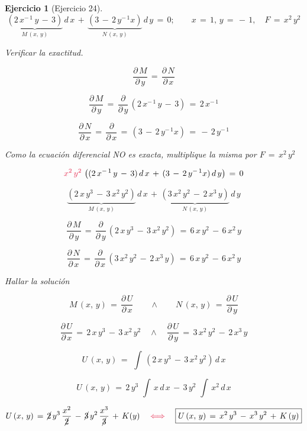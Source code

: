 \documentclass[a4paper,11pt,openany]{book}
\newtheorem{ejer}{Ejercicio}[section]
\begin{document}
\begin{ejer}[Ejercicio 24] 

  $$\underbrace{(2\,x^{-\,1}\,y\,-\,3)}_{M\,(x,\,y)}\,d\,x\,+\,\underbrace{(3\,-\,2\,y^{-\,1}x)}_{N\,(x,\,y)}\,d\,y\,=\,0; \qquad x\,=\,1, \, y\,=\,-\,1, \quad F\,=\,x^{2}\,y^{2}$$ 

 Verificar la exactitud. 

$$\dfrac{\partial\,M}{\partial\,y}\,=\,\dfrac{\partial\,N}{\partial\,x}$$ 

$$\dfrac{\partial\,M}{\partial\,y}\,=\,\dfrac{\partial}{\partial\,y}\,(2\,x^{-\,1}\,y\,-\,3)\,=\,2\,x^{-\,1}$$ 

$$\dfrac{\partial\,N}{\partial\,x}\,=\,\dfrac{\partial}{\partial\,x}\,=\,(3\,-\,2\,y^{-\,1}x)\,=\,-\,2\,y^{-\,1}$$

 Como la ecuación diferencial NO es exacta, multiplique la misma por $F\,=\,x^{2}\,y^{2}$ 


$$\textcolor{amaranth}{x^{2}\,y^{2}}\,\left( (2\,x^{-\,1}\,y\,-\,3)\,d\,x\,+\,(3\,-\,2\,y^{-\,1}x)\,d\,y \right) \,=\,0$$ 

$$\underbrace{(2\,x\,y^{3}\,-\,3\,x^{2}\,y^{2})}_{M\,(x,\,y)}\,d\,x\,+\,\underbrace{(3\,x^{2}\,y^{2}\,-\,2\,x^{3}\,y)}_{N\,(x,\,y)}\,d\,y$$ 

$$\dfrac{\partial\,M}{\partial\,y}\,=\,\dfrac{\partial}{\partial\,y}\,(2\,x\,y^{3}\,-\,3\,x^{2}\,y^{2})\,=\,\boxed{6\,x\,y^{2}\,-\,6\,x^{2}\,y}$$ 

$$\dfrac{\partial\,N}{\partial\,x}\,=\,\dfrac{\partial}{\partial\,x}\,(3\,x^{2}\,y^{2}\,-\,2\,x^{3}\,y)\,=\,\boxed{6\,x\,y^{2}\,-\,6\,x^{2}\,y}$$ 

 Hallar la solución 

$$\boxed{M\,(x,\,y)\,=\,\dfrac{\partial\,U}{\partial\,x}} \qquad \wedge \qquad \boxed{N\,(x,\,y)\,=\,\dfrac{\partial\,U}{\partial\,y}}$$

$$\boxed{\dfrac{\partial\,U}{\partial\,x}\,=\,2\,x\,y^{3}\,-\,3\,x^{2}\,y^{2}} \quad \wedge \quad \boxed{\dfrac{\partial\,U}{\partial\,y}\,=\,3\,x^{2}\,y^{2}\,-\,2\,x^{3}\,y} $$ 

$$U\,(x,\,y)\,=\,\displaystyle\,\int\,\left(2\,x\,y^{3}\,-\,3\,x^{2}\,y^{2} \right)\,d\,x$$ 

$$U\,(x,\,y)\,=\,2\,y^{3}\,\displaystyle\,\int\,x\,d\,x\,-\,3\,y^{2}\,\displaystyle\,\int\,x^{2}\,d\,x$$ 

$$U\,(x,\,y)\,=\,\cancel{2}\,y^{3}\,\dfrac{x^{2}}{\cancel{2}}\,-\,\cancel{3}\,y^{2}\,\dfrac{x^{3}}{\cancel{3}}\,+\,K(y) \quad \textcolor{amaranth}{\iff} \quad \boxed{U\,(x,\,y)\,=\,x^{2}\,y^{3}\,-\,x^{3}\,y^{2}\,+\,K\,(y)}$$ 


\end{ejer}
\end{document}
